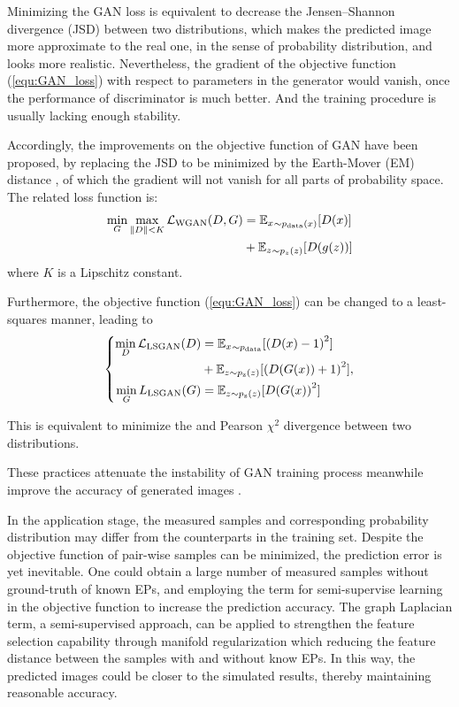 Minimizing the GAN loss is equivalent to decrease the Jensen–Shannon divergence (JSD) between two distributions, which makes the predicted image more approximate to the real one, in the sense of probability distribution, and looks more realistic.
Nevertheless, the gradient of the objective function (\ref{equ:GAN_loss}) with respect to parameters in the generator would vanish, once the performance of discriminator is much better\cite{arjovskyy2017b}. And the training procedure is usually lacking enough stability.

Accordingly, the improvements on the objective function of GAN have been proposed, by replacing the JSD to be minimized by the Earth-Mover (EM) distance \cite{arjovsky2017}, of which the gradient will not vanish for all parts of probability space. The related loss function is:
\begin{equation}\label{equ:WGAN_loss}
\begin{aligned}
\mathop {\min }\limits_G \mathop {\max }\limits_{\left\| D \right\| < K} {\cal{L}_{{\rm{WGAN}}}}(D,G) &= {\mathbb{E}_x}_{\sim{p_{{\rm{data}}}}(x)}[D(x)] \\ &+
{\mathbb{E}_z}_{\sim{p_z}(z)}[D(g(z))]
\end{aligned}
\end{equation}
where $K$ is a Lipschitz constant.

Furthermore, the objective function (\ref{equ:GAN_loss}) can be changed to a least-squares manner, leading to
\begin{equation}\label{equ:LSGAN_loss}
\left\{
\begin{aligned}
\mathop {\min }\limits_D {\cal{L}_{{\rm{LSGAN}}}}(D) &= {\mathbb{E}_x}_{\sim{p_{{\rm{data}}}}}[{{(D(x) - 1)}^2}] \\ &+ {\mathbb{E}_{z\sim{p_{\rm{z}}}(z)}}[{{(D(G(x)) + 1)}^2}], \\
\mathop {\min }\limits_G {L_{{\rm{LSGAN}}}}(G) &= {\mathbb{E}_{z\sim{p_{\rm{z}}}(z)}}[D{{(G(x))}^2}]
\end{aligned}
\right.
\end{equation}

This is equivalent to minimize the and Pearson $\chi^2$ divergence\cite{Mao2017} between two distributions.

These practices attenuate the instability of GAN training process meanwhile improve the accuracy of generated images \cite{Wang2019x}.

In the application stage, the measured samples and corresponding probability distribution may differ from the counterparts in the training set. Despite the objective function of pair-wise samples can be minimized, the prediction error is yet inevitable.
One could obtain a large number of measured samples without ground-truth of known EPs, and employing the term for semi-supervise learning in the objective function to increase the prediction accuracy.
The graph Laplacian term\cite{Sheikhpour2017Feature,Sheikhpour2020A}, a semi-supervised approach, can be applied to strengthen the feature selection capability through manifold regularization which reducing the feature distance between the samples with and without know EPs. In this way, the predicted images could be closer to the simulated results, thereby maintaining reasonable accuracy.

